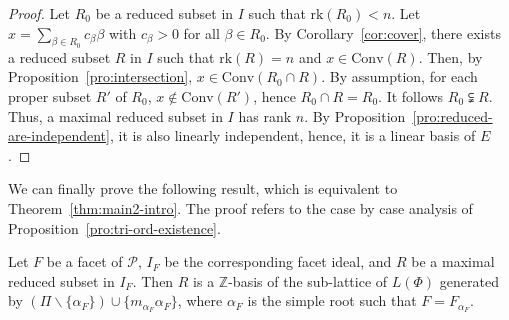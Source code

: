 \documentclass[ALCO,published]{cedram}
\newcommand\pol{\mathcal P}
\theoremstyle{plain}
\newcommand\smeno{\smallsetminus}
\newcommand\ganz{\mathbb Z}
\newcommand\pol{\mathcal P}
\newcommand\conv{\mathrm{Conv}}
\newcommand\rk{\mathrm{rk}}
\newcommand\al{\alpha}
\newcommand\be{\beta}
\begin{document}
\begin{proof}
Let $R_0$ be a reduced subset in $I$ such that $\rk (R_0)< n$. 
Let $x=\sum_{\be\in R_0} c_\be \be$ with $c_\be> 0$ for all $\be \in R_0$.
By Corollary~\ref{cor:cover}, there exists a reduced subset $R$ in $I$ such that $\rk(R)=n$ and $x\in \conv(R)$. 
Then, by Proposition~\ref{pro:intersection}, $x\in \conv(R_0\cap R)$. 
By assumption, for each proper subset $R'$ of $R_0$, $x\not\in\conv(R')$, hence $R_0\cap R=R_0$.
It follows  $R_0\subsetneqq R$.
Thus, a maximal reduced subset in $I$ has rank $n$.
By Proposition~\ref{pro:reduced-are-independent}, it is also linearly independent, hence, it is a linear basis of $E$.
\end{proof}
 
We can finally prove the following result, which  is equivalent to  Theorem~\ref{thm:main2-intro}. 
The proof refers to the case by case analysis of Proposition~\ref{pro:tri-ord-existence}. 

\begin{thm}\label{thm:main2}
Let $F$ be a facet of $\pol$, $I_F$ be the corresponding facet ideal, and $R$ be a maximal reduced subset in $I_F$. 
Then $R$ is a $\ganz$-basis of the sub-lattice of $L(\Phi)$ generated by $(\Pi\smeno\{\al_F\})\cup \{m_{\al_F}\al_F\}$, where $\al_F$ is  the simple root such that $F=F_{\al_F}$.
\end{thm}
\end{document}
